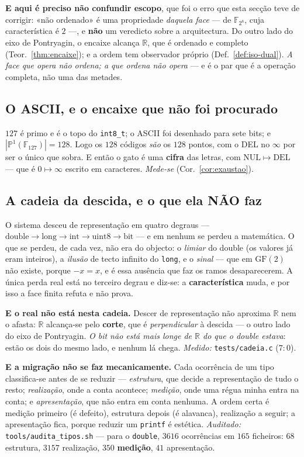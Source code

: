 \documentclass[11pt,a4paper]{article}
\newcommand{\code}[1]{\texttt{\small #1}}
\begin{document}
\textbf{E aqui é preciso não confundir escopo}, que foi o erro que esta
secção teve de corrigir: «não ordenado» é uma propriedade
\emph{daquela face} --- de $\mathbb{F}_{2^8}$, cuja característica é
$2$ ---, e \textbf{não} um veredicto sobre a arquitectura. Do outro lado
do eixo de Pontryagin, o encaixe alcança $\mathbb{R}$, que é ordenado e
completo (Teor.~\ref{thm:encaixe}); e a ordem tem observador próprio
(Def.~\ref{def:iso-dual}). \emph{A face que opera não ordena; a que
ordena não opera} --- e é o par que é a operação completa, não uma das
metades.

\subsection*{O ASCII, e o encaixe que não foi procurado}
$127$ é primo e é o topo do \code{int8\_t}; o ASCII foi desenhado para
sete bits; e $|\mathbb{P}^1(\mathbb{F}_{127})|=128$. Logo os $128$
códigos \emph{são} os $128$ pontos, com o DEL no $\infty$ por ser o
único que sobra. E então o gato é uma \textbf{cifra} das letras, com
$\mathrm{NUL}\mapsto\mathrm{DEL}$ --- que é $0\mapsto\infty$ escrito em
caracteres. \emph{Mede-se} (Cor.~\ref{cor:exaustao}).

\subsection*{A cadeia da descida, e o que ela NÃO faz}
O sistema desceu de representação em quatro degraus ---
$\text{double}\to\text{long}\to\text{int}\to\text{uint8}\to\text{bit}$ ---
e em nenhum se perdeu a matemática. O que se perdeu, de cada vez, não era
do objecto: o \emph{limiar} do double (os valores já eram inteiros), a
\emph{ilusão} de tecto infinito do \code{long}, e o \emph{sinal} --- que
em $\mathrm{GF}(2)$ não existe, porque $-x=x$, e é essa ausência que faz
os ramos desaparecerem. A única perda real está no terceiro degrau e
diz-se: a \textbf{característica} muda, e por isso a face finita refuta e
não prova.

\textbf{E o real não está nesta cadeia.} Descer de representação não
aproxima $\mathbb{R}$ nem o afasta: $\mathbb{R}$ alcança-se pelo
\textbf{corte}, que é \emph{perpendicular} à descida --- o outro lado do
eixo de Pontryagin. \emph{O bit não está mais longe de $\mathbb{R}$ do
que o double estava}: estão os dois do mesmo lado, e nenhum lá chega.
\emph{Medido:} \code{tests/cadeia.c} ($7{:}0$).

\textbf{E a migração não se faz mecanicamente.} Cada ocorrência de um
tipo classifica-se antes de se reduzir --- \emph{estrutura}, que decide a
representação de tudo o resto; \emph{realização}, onde a conta acontece;
\emph{medição}, onde uma régua minha entra na conta; e
\emph{apresentação}, que não entra em conta nenhuma. A ordem certa é
medição primeiro (é defeito), estrutura depois (é alavanca), realização a
seguir; a apresentação fica, porque reduzir um \code{printf} é estética.
\emph{Auditado:} \code{tools/audita\_tipos.sh} --- para o \code{double},
$3616$ ocorrências em $165$ ficheiros: $68$ estrutura, $3157$ realização,
$350$ \textbf{medição}, $41$ apresentação.
\end{document}
